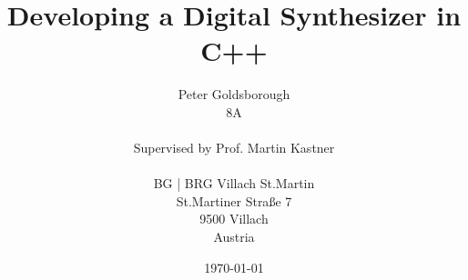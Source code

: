 \title{Developing a Digital Synthesizer in C++}

\author{
Peter Goldsborough \\
8A\\\\
Supervised by Prof. Martin Kastner\\\\
BG | BRG Villach St.Martin\\
St.Martiner Stra{\ss}e 7\\
9500 Villach\\
Austria
}

\date{\today}

\maketitle
